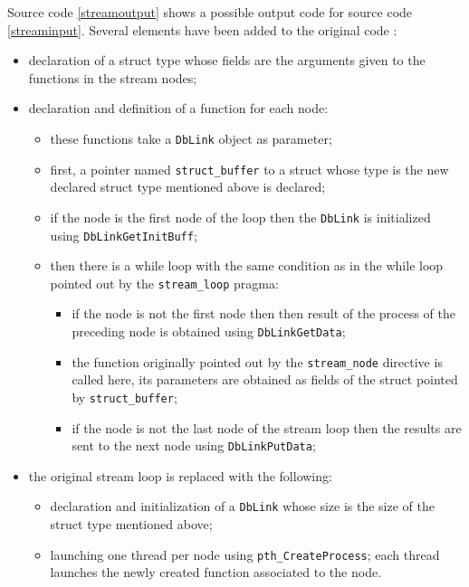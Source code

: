 \documentclass[a4paper]{article}
\begin{document}
		Source code \ref{streamoutput} shows a possible output code for source code \ref{streaminput}. Several elements have been added to the original code :
	\begin{itemize}
		\item declaration of a struct type whose fields are the arguments given to the functions in the stream nodes;
		\item declaration and definition of a function for each node:
		\begin{itemize}
			\item these functions take a \verb+DbLink+ object as parameter;
			\item first, a pointer named \verb+struct_buffer+ to a struct whose type is the new declared struct type mentioned above is declared;
			\item if the node is the first node of the loop then the \verb+DbLink+ is initialized using \verb+DbLinkGetInitBuff+;
			\item then there is a while loop with the same condition as in the while loop pointed out by the \verb+stream_loop+ pragma:
			\begin{itemize}
				\item if the node is not the first node then then result of the process of the preceding node is obtained using \verb+DbLinkGetData+;
				\item the function originally pointed out by the \verb+stream_node+ directive is called here, its parameters are obtained as fields of the struct pointed by \verb+struct_buffer+;
				\item if the node is not the last node of the stream loop then the results are sent to the next node using \verb+DbLinkPutData+;
			\end{itemize}
		\end{itemize}
		\item the original stream loop is replaced with the following:
		\begin{itemize}
			\item declaration and initialization of a \verb+DbLink+ whose size is the size of the struct type mentioned above;
			\item launching one thread per node using \verb+pth_CreateProcess+; each thread launches the newly created function associated to the node.
		\end{itemize}
	\end{itemize}
\end{document}
